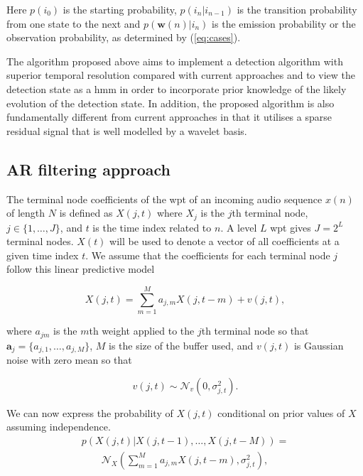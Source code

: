 Here $p(i_{0})$ is the starting probability, $p(i_n | i_{n-1})$ is the transition probability from one state to the next and $p(\boldsymbol{w}(n) | i_n)$ is the emission probability or the observation probability, as determined by (\ref{eq:cases}).

The algorithm proposed above aims to implement a detection algorithm with superior temporal resolution compared with current approaches and to view the detection state as a \gls{hmm} in order to incorporate prior knowledge of the likely evolution of the detection state. In addition, the proposed algorithm is also fundamentally different from current approaches in that it utilises a sparse residual signal that is well modelled by a wavelet basis.

\subsection{AR filtering approach}\label{sec:WPdetectionAR}

The terminal node coefficients of the \gls{wpt} of an incoming audio sequence $x(n)$ of length $N$ is defined as $X(j,t)$ where $X_j$ is the $j$th terminal node, $j \in \{1, \ldots, J\}$, and $t$ is the time index related to $n$. A level $L$ \gls{wpt} gives $J = 2^L$ terminal nodes. $X(t)$ will be used to denote a vector of all coefficients at a given time index $t$. We assume that the coefficients for each terminal node $j$ follow this linear predictive model

\begin{equation}\label{eq:lpm}
X(j,t) = \sum_{m=1}^{M} a_{j,m} X(j,t - m) + v(j,t),
\end{equation}

where $a_{jm}$ is the $m$th weight applied to the $j$th terminal node so that $\mathbf{a}_j = \{a_{j,1}, \ldots, a_{j,M} \}$, $M$ is the size of the buffer used, and $v(j,t)$ is Gaussian noise with zero mean so that

\begin{equation}\label{eq:lpmnoise}
v(j,t) \sim \mathcal{N}_v(0,\sigma^2_{j,t}).
\end{equation}

We can now express the probability of $X(j,t)$ conditional on prior values of $X$ assuming independence.
\
\begin{align}\label{eq:likelihood}
p\left(X\left(j,t\right)|X\left(j,t-1\right),\ldots,X\left(j,t-M\right)\right) = \nonumber\\
\qquad \mathcal{N}_X\left( \sum_{m=1}^M a_{j,m} X(j,t - m), \sigma_{j,t}^2\right),
\end{align}

